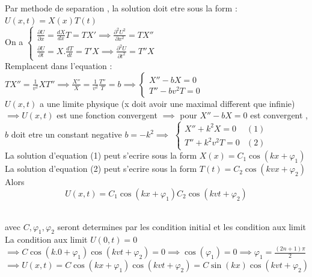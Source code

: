 \documentclass[12pt]{book}
\begin{document}
            Par methode de separation , la solution doit etre sous la form : $ U(x,t) = X(x)T(t) $ \\
            On a $ \begin{cases} \frac{\partial U}{\partial x} = \frac{dX}{dx}T =TX'\implies\frac{\partial^2U^2}{\partial x^2}=TX'' \\ \frac{\partial U}{\partial t} = X.\frac{dT}{dt} = T'X \implies \frac{\partial^2 U}{\partial t^2}=T''X\end{cases} $ \\
            Remplacent dans l'equation : $ TX'' = \frac{1}{v^2}XT'' \implies \frac{X''}{X}=\frac{1}{v^2}\frac{T''}{T}= b \implies \begin{cases}  X''-bX=0 \\ T''-bv^2T=0\end{cases}$ \\
            $ U(x,t) $ a une limite physique (x doit avoir une maximal different que infinie) \\
            $ \implies U(x,t) $ est une fonction convergent $\implies $ pour $X'' -bX =0 $  est convergent ,\\
            $b$ doit etre un constant negative $b = -k^2 \implies$ $\begin{cases}  X''+k^2X=0  & (1)\\ T''+k^2v^2T=0 & (2)\end{cases}$\\
            La solution d'equation (1) peut s'ecrire sous la form $X(x) =C_1\cos(kx+\varphi_1)$\\
            La solution d'equation (2) peut s'ecrire sous la form $T(t) =C_2\cos(kvx+\varphi_2)$ \\
            Alors \[ U(x,t) = C_1\cos(kx+\varphi_1)C_2\cos(kvt+\varphi_2) \] \\
            \begin{center}
            \end{center}
            avec $C,\varphi_1,\varphi_2 $ seront determines par les condition initial et les condition aux limit \\
            La condition aux limit $U(0,t) =0$ \\
            $ \implies C\cos(k.0+\varphi_1)\cos(kvt+\varphi_2) = 0 \implies \cos(\varphi_1) =0 \implies \varphi_1 = \frac{(2n+1)\pi}{2}$\\
            $ \implies U(x,t) = C\cos(kx+\varphi_1)\cos(kvt+\varphi_2)=C\sin(kx)\cos(kvt+\varphi_2) $\\
\end{document}
